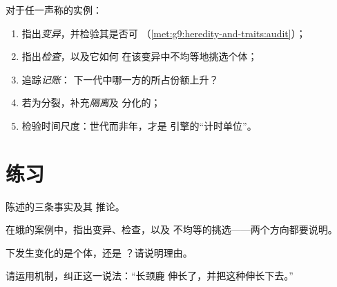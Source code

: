 \begin{method}[在任何案例中运行引擎]\label{met:g9:how-species-change:run}
对于任一声称的实例：
\begin{enumerate}
  \item 指出\emph{变异}，并检验其是否可
        （\cref{met:g9:heredity-and-traits:audit}）；
  \item 指出\emph{检查}，以及它如何
        在该变异中不均等地挑选个体；
  \item 追踪\emph{记账}：
        下一代中哪一方的所占份额上升？
  \item 若为分裂，补充\emph{隔离}及
        分化的；
  \item 检验时间尺度：世代而非年，才是
        引擎的“计时单位”。
\end{enumerate}
\end{method}

\section{练习}

\begin{exercise}[$\star$]\label{exo:g9:how-species-change:1}
陈述的三条事实及其
推论。
\end{exercise}

\begin{exercise}[$\star$]\label{exo:g9:how-species-change:2}
在蛾的案例中，指出变异、检查，以及
不均等的挑选——两个方向都要说明。
\end{exercise}

\begin{exercise}[$\star$]\label{exo:g9:how-species-change:3}
下发生变化的是个体，还是
？请说明理由。
\end{exercise}

\begin{exercise}[$\star$]\label{exo:g9:how-species-change:4}
请运用机制，纠正这一说法：“长颈鹿
伸长了，并把这种伸长下去。”
\end{exercise}

